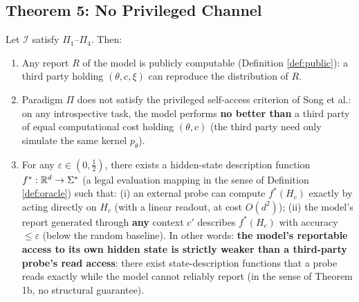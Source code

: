 \subsection{Theorem 5: No Privileged Channel}

\begin{theorem}\label{thm:privilege}
Let $\mathcal{I}$ satisfy $\Pi_1$--$\Pi_4$. Then:

\begin{enumerate}[align=left, labelwidth=!, labelsep=0.8em, leftmargin=!, itemindent=0pt]
\item[(\textbf{5a})\textbf{Public computability}] Any report $R$ of the model is publicly
computable (Definition \ref{def:public}): a third party holding $(\theta, c, \xi)$ can
reproduce the distribution of $R$.
\item[(\textbf{5b})\textbf{Privileged-access criterion fails}] Paradigm $\Pi$ does not satisfy
the privileged self-access criterion of Song et
al.\cite{song-privileged-2025}: on any introspective task, the model performs \textbf{no
better than} a third party of equal computational cost holding $(\theta, c)$ (the third party
need only simulate the same kernel $p_\theta$).
\item[(\textbf{5c})\textbf{Reportable access is weaker than external probes}] For any
$\varepsilon \in (0, \tfrac12)$, there exists a hidden-state description function
$f^{*}: \mathbb{R}^d \to \Sigma^{*}$ (a legal evaluation mapping in the sense of Definition
\ref{def:oracle}) such that: (i) an external probe can compute $f^{*}(H_c)$ exactly by acting
directly on $H_c$ (with a linear readout, at cost $O(d^2)$); (ii) the model's report generated
through \textbf{any} context $c'$ describes $f^{*}(H_c)$ with accuracy $\le \varepsilon$
(below the random baseline).
In other words: \textbf{the model's reportable access to its own hidden state is strictly
weaker than
a third-party probe's read access}: there exist state-description functions that a probe
reads exactly while the model cannot reliably report (in the sense of Theorem 1b, no
structural guarantee).
\end{enumerate}
\end{theorem}


